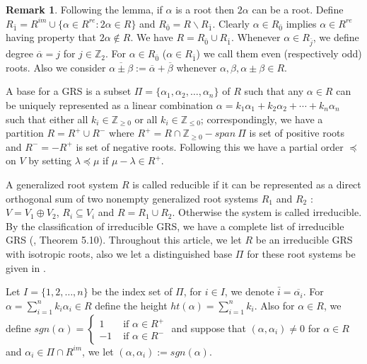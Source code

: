 \documentclass[11pt]{amsart}
\theoremstyle{plain}
\theoremstyle{definition}
\newtheorem{rmk}[thm]{Remark}
\numberwithin{equation}{section}
\newcommand{\al}{\alpha}
\newcommand{\be}{\beta}
\newcommand{\la}{\lambda}
\newcommand{\Z}{\mbox{$\mathbb Z$}}
\begin{document}
	\begin{rmk}
	Following the lemma, if $\alpha$ is a root then $2\alpha$ can be a root. Define $R_{\bar 1}=R^{im}\cup\{\alpha\in R^{re}:2\alpha\in R\}$ and $R_{\bar 0}=R\backslash R_{\bar 1}.$ Clearly $\alpha \in R_{\bar 0}$ implies $\alpha \in R^{re}$ having property that $2\alpha \notin R.$ We have $R=R_{\bar0}\cup R_{\bar 1}.$ Whenever $\al\in R_{\bar j}$, we define degree $\overline{\al}=j$ for $j\in\Z_2.$ For $\al\in R_{\bar 0}$ ($\al\in R_{\bar 1}$) we call them even (respectively odd) roots. Also we consider $\overline{\al\pm\be}:=\overline{\al}+\overline{\be}$ whenever $\al,\be,\al\pm\be\in R$.
	\end{rmk}
	A base for a GRS is a subset $\Pi=\{\alpha_1,\alpha_2,\ldots,\alpha_n\}$ of $R$ such that any $\alpha\in R$ can be uniquely represented as a linear combination $\alpha=k_1\al_1+k_2\al_2+\cdots+k_n\alpha_n$ such that either all $k_i\in\Z_{\geq 0}$ or all $k_i\in\Z_{\leq 0}$; correspondingly, we have a partition $R=R^+\cup R^-$ where $R^+=R\cap\Z_{\geq 0}-span~\Pi$ is set of positive roots and $R^-=-R^+$ is set of negative roots. Following this we have a partial order $\preceq$ on $V$ by setting $\la\preceq\mu$ if $\mu-\la\in R^+$.
	
	A generalized root system $R$ is called reducible if it can be represented as a direct orthogonal sum of two nonempty generalized root systems $R_1$ and $R_2$ : $V = V_1 \oplus V_2$, $R_i\subseteq V_i$ and $R = R_1 \cup R_2$. Otherwise the system is called irreducible. By the classification of irreducible GRS, we have a complete list of irreducible GRS (\cite{serganova1996generalizations}, Theorem 5.10). Throughout this article, we let $R$ be an irreducible GRS with isotropic roots, also we let a distinguished base $\Pi$ for these root systems be given in \cite{frappat1989structure,iohara2001central,kac1977lie}.
	
	Let $I=\{1,2,\ldots,n\}$ be the index set of $\Pi$, for $i\in I$, we denote $\bar{i}=\overline{\al_i}.$ For $\alpha=\sum\limits_{i=1}^{n}k_i\alpha_i\in R$ define the height $ht(\alpha)=\sum\limits_{i=1}^{n}k_i$. Also for $\alpha\in R$, we define $sgn(\al)=\begin{cases}1&\text{ if }\al\in R^+\\-1&\text{ if }\al\in R^-\end{cases}$ and suppose that $(\al,\al_i)\neq 0$ for $\al\in R$ and $\al_i\in\Pi\cap R^{im}$, we let $(\al,\al_i):=sgn(\al)$. %
	
\end{document}
